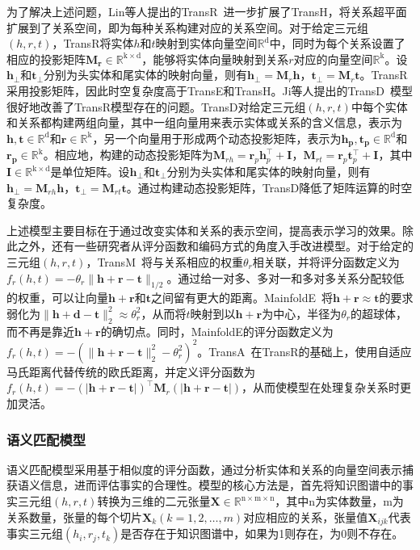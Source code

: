 \documentclass[algorithmlist, AutoFakeBold, AutoFakeSlant, figurelist, tablelist, nomlist, engineering]{seuthesix}
\begin{document}
为了解决上述问题，Lin等人提出的TransR~\cite{lin2015learning}进一步扩展了TransH，将关系超平面扩展到了关系空间，即为每种关系构建对应的关系空间。对于给定三元组$(h, r, t)$，TransR将实体$h$和$t$映射到实体向量空间$\mathbb{R}^{\mathrm{d}}$中，同时为每个关系设置了相应的投影矩阵$\mathbf{M_r} \in \mathbb{R}^\mathrm{k \times d}$，能够将实体向量映射到关系$r$对应的向量空间$\mathbb{R}^{\mathrm{k}}$。设$\bm{h_\perp}$和$\bm{t_\perp}$分别为头实体和尾实体的映射向量，则有$\bm{h}_{\perp}=\mathbf{M}_r \bm{h}$，$\bm{t}_{\perp} = \mathbf{M}_r \bm{t}$。TransR采用投影矩阵，因此时空复杂度高于TransE和TransH。Ji等人提出的TransD~\cite{ji2015knowledge}模型很好地改善了TransR模型存在的问题。TransD对给定三元组$(h, r, t)$中每个实体和关系都构建两组向量，其中一组向量用来表示实体或关系的含义信息，表示为$\bm{h, t} \in \mathbb{R}^{\mathrm{d}}$和$\bm{r} \in \mathbb{R}^{\mathrm{k}}$，另一个向量用于形成两个动态投影矩阵，表示为$\bm{h_p, t_p} \in \mathbb{R}^{\mathrm{d}}$和$\bm{r_p} \in \mathbb{R}^{\mathrm{k}}$。相应地，构建的动态投影矩阵为$\mathbf{M}_{r h} = \bm{r}_p \bm{h}_p^{\top} + \mathbf{I}$，$\mathbf{M}_{r t}=\bm{r}_p \bm{t}_p^{\top} + \mathbf{I}$，其中$\mathbf{I} \in \mathbb{R}^{\mathrm{k \times d}}$是单位矩阵。设$\bm{h_\perp}$和$\bm{t_\perp}$分别为头实体和尾实体的映射向量，则有$\bm{h}_{\perp}=\mathbf{M}_{r h} \bm{h}$，$\bm{t}_{\perp}=\mathbf{M}_{r t} \bm{t}$。通过构建动态投影矩阵，TransD降低了矩阵运算的时空复杂度。

上述模型主要目标在于通过改变实体和关系的表示空间，提高表示学习的效果。除此之外，还有一些研究者从评分函数和编码方式的角度入手改进模型。对于给定的三元组$(h, r, t)$，TransM~\cite{fan2014transition}将与关系相应的权重$\theta_r$相关联，并将评分函数定义为$f_r(h, t)=-\theta_r\|\bm{h} + \bm{r} - \bm{t}\|_{1 / 2}$。通过给一对多、多对一和多对多关系分配较低的权重，可以让向量$\bm{h} + \bm{r}$和$\bm{t}$之间留有更大的距离。MainfoldE~\cite{xiao2016one}将$\bm{h} + \bm{r} \approx \bm{t}$的要求弱化为$\|\bm{h} + \bm{d} - \bm{t}\|_2^2 \approx \theta_r^2$，从而将$t$映射到以$\bm{h} + \bm{r}$为中心，半径为$\theta_r$的超球体，而不再是靠近$\bm{h} + \bm{r}$的确切点。同时，MainfoldE的评分函数定义为$f_r(h, t) = -\left(\|\bm{h} + \bm{r} - \bm{t}\|_2^2 - \theta_r^2\right)^2$。TransA~\cite{xiao2015transa}在TransR的基础上，使用自适应马氏距离代替传统的欧氏距离，并定义评分函数为$f_r(h, t) = -(|\bm{h} + \bm{r} - \bm{t}|)^{\top} \mathbf{M}_r(|\bm{h} + \bm{r} - \bm{t}|)$，从而使模型在处理复杂关系时更加灵活。

\subsubsection{语义匹配模型}
语义匹配模型采用基于相似度的评分函数，通过分析实体和关系的向量空间表示捕获语义信息，进而评估事实的合理性。模型的核心方法是，首先将知识图谱中的事实三元组$(h, r, t)$转换为三维的二元张量$\mathbf{X} \in \mathbb{R}^{\mathrm{n \times m \times n}}$，其中n为实体数量，m为关系数量，张量的每个切片$\mathbf{X}_k(k=1,2, \ldots, m)$对应相应的关系，张量值$\mathbf{X}_{i j k}$代表事实三元组$\left(h_i, r_j, t_k\right)$是否存在于知识图谱中，如果为1则存在，为0则不存在。
\end{document}
